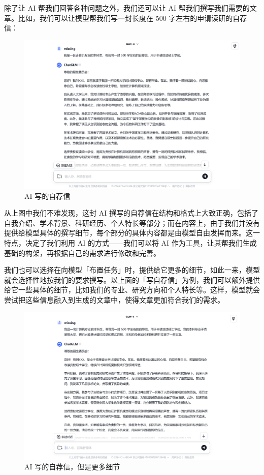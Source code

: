 除了让 AI 帮我们回答各种问题之外，我们还可以让 AI 帮我们撰写我们需要的文章。比如，我们可以让模型帮我们写一封长度在 500 字左右的申请读研的自荐信：

\begin{figure}[htb!]
  \centering
  \includegraphics[width=.8\textwidth]{assets/surpass/Zhipu_q5.png}
  \caption{AI 写的自荐信}
  \label{fig:Zhipu_q5}
\end{figure}

从上图中我们不难发现，这封 AI 撰写的自荐信在结构和格式上大致正确，包括了自我介绍、学术背景、科研经历、个人特长等部分；而在内容上，由于我们并没有提供给模型具体的撰写细节，每个部分的具体内容都是由模型自由发挥而来。这一特点，决定了我们利用 AI 的方式——我们可以将 AI 作为工具，让其帮我们生成基础的构架，再根据自己的需求进行修改和完善。

我们也可以选择在向模型「布置任务」时，提供给它更多的细节，如此一来，模型就会选择性地按我们的要求撰写。以上面的「写自荐信」为例，我们可以额外提供给它一些具体的细节，比如我们的专业、研究方向和个人特长等。这样，模型就会尝试把这些信息融入到生成的文章中，使得文章更加符合我们的需求。

\begin{figure}[htb!]
  \centering
  \includegraphics[width=.8\textwidth]{assets/surpass/Zhipu_q6.png}
  \caption{AI 写的自荐信，但是更多细节}
  \label{fig:Zhipu_q6}
\end{figure}

